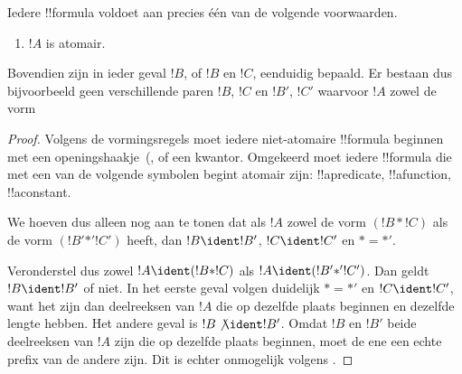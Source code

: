 \documentclass[openany]{memoir}
\begin{document}
\begin{prop}
Iedere !!{formula} voldoet aan precies één van de volgende voorwaarden.
\begin{enumerate}
\item $!A$ is atomair.







\end{enumerate}
Bovendien zijn in ieder geval $!B$, of $!B$ en $!C$, eenduidig
bepaald. Er bestaan dus bijvoorbeeld geen verschillende paren $!B$,
$!C$ en $!B'$, $!C'$ waarvoor $!A$ zowel de vorm
\end{prop}

\begin{proof}
Volgens de vormingsregels moet iedere niet-atomaire !!{formula}
beginnen met een openingshaakje~(,  of een
kwantor. Omgekeerd moet iedere !!{formula} die met een van de volgende
symbolen begint atomair zijn: !!a{predicate}, !!a{function},
!!a{constant}.

We hoeven dus alleen nog aan te tonen dat als $!A$ zowel de vorm $(!B
\ast !C)$ als de vorm $(!B' \mathbin{\ast'} !C')$ heeft, dan $!B
\ident !B'$, $!C \ident !C'$ en $\ast = {\ast'}$.

Veronderstel dus zowel $!A \ident (!B \ast !C)$ als $!A \ident (!B'
\mathbin{\ast'} !C')$. Dan geldt $!B \ident !B'$ of niet. In het eerste
geval volgen duidelijk $\ast = {\ast'}$ en $!C \ident !C'$, want het
zijn dan deelreeksen van $!A$ die op dezelfde plaats beginnen en
dezelfde lengte hebben. Het andere geval is $!B \not\ident !B'$. Omdat
$!B$ en $!B'$ beide deelreeksen van $!A$ zijn die op dezelfde plaats
beginnen, moet de ene een echte prefix van de andere zijn. Dit is
echter onmogelijk volgens .
\end{proof}
\endgroup
\end{document}
